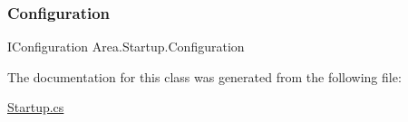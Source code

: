 \subsubsection{\texorpdfstring{Configuration}{Configuration}}
{\footnotesize\ttfamily I\+Configuration Area.\+Startup.\+Configuration\hspace{0.3cm}{\ttfamily [get]}}



The documentation for this class was generated from the following file\+:\begin{DoxyCompactItemize}
\item 
\mbox{\hyperlink{Startup_8cs}{Startup.\+cs}}\end{DoxyCompactItemize}
